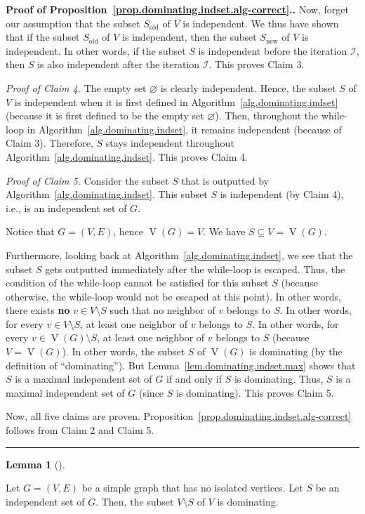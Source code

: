 \documentclass[numbers=enddot,12pt,final,onecolumn,notitlepage]{scrartcl}%
\theoremstyle{definition}
\newtheorem{lem}[theo]{Lemma}
\newenvironment{lemma}[1][]
{\begin{lem}[#1]\begin{leftbar}}
{\end{leftbar}\end{lem}}
\newenvironment{proof}[1][Proof]{\noindent\textbf{#1.} }{\ \rule{0.5em}{0.5em}}
\newcommand{\tup}[1]{\left( #1 \right)}
\newcommand{\verts}[1]{\operatorname{V}\left( #1 \right)}
\begin{document}
\begin{proof}[Proof of
Proposition~\ref{prop.dominating.indset.alg-correct}.]
Now, forget our assumption that the subset $S_{\operatorname{old}}$ of
$V$ is independent. We thus have shown that if
the subset $S_{\operatorname{old}}$ of $V$ is independent, then
the subset $S_{\operatorname{new}}$ of $V$ is independent. In other
words, if the subset $S$ is independent before the iteration
$\mathcal{I}$, then $S$ is also independent after the iteration
$\mathcal{I}$. This proves Claim 3.

\textit{Proof of Claim 4.} The empty set $\varnothing$ is clearly
independent. Hence, the subset $S$ of $V$ is independent when it is
first defined in Algorithm~\ref{alg.dominating.indset} (because it is
first defined to be the empty set $\varnothing$). Then, throughout the
while-loop in Algorithm~\ref{alg.dominating.indset}, it remains
independent (because of Claim 3). Therefore, $S$ stays independent
throughout Algorithm~\ref{alg.dominating.indset}. This proves Claim 4.

\textit{Proof of Claim 5.} Consider the subset $S$ that is outputted
by Algorithm~\ref{alg.dominating.indset}. This subset $S$ is
independent (by Claim 4), i.e., is an independent set of $G$.

Notice that $G = \tup{V, E}$, hence $\verts{G} = V$. We have
$S \subseteq V = \verts{G}$.

Furthermore, looking back at Algorithm~\ref{alg.dominating.indset}, we
see that the subset $S$ gets outputted immediately after the
while-loop is escaped. Thus, the condition of the while-loop cannot be
satisfied for this subset $S$ (because otherwise, the while-loop would
not be escaped at this point). In other words, there exists
\textbf{no} $v \in V \setminus S$ such that no neighbor of $v$ belongs
to $S$. In other words, for every $v \in V \setminus S$, at least one
neighbor of $v$ belongs to $S$. In other words, for every
$v \in \verts{G} \setminus S$, at least one neighbor of $v$ belongs to
$S$ (because $V = \verts{G}$). In other words, the subset $S$ of
$\verts{G}$ is dominating (by the definition of ``dominating'').
But Lemma~\ref{lem.dominating.indset.max} shows that $S$ is a maximal
independent set of $G$ if and only if $S$ is dominating. Thus, $S$ is
a maximal independent set of $G$ (since $S$ is dominating). This proves
Claim 5.

Now, all five claims are proven.
Proposition~\ref{prop.dominating.indset.alg-correct} follows from
Claim 2 and Claim 5.
\end{proof}

\begin{lemma} \label{lem.dominating.indset.max.compl}
Let $G = \tup{V, E}$ be a simple graph that has no isolated vertices.
Let $S$ be an independent set of $G$.
Then, the subset $V \setminus S$ of $V$ is dominating.
\end{lemma}
\end{document}
